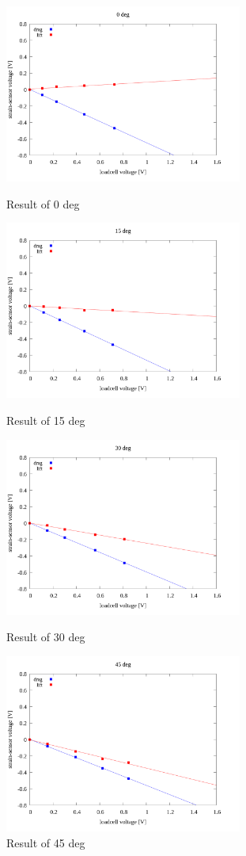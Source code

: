 \documentclass[twocolumn,a4j]{jsarticle}
\begin{document}
\begin{figure}[htbp]
    \footnotesize
    \begin{center}
        \includegraphics[width=78mm]{../images/linear/0_linear.png}
        \caption{Result of 0 deg}
        \includegraphics[width=78mm]{../images/linear/15_linear.png}
        \caption{Result of 15 deg}
        \includegraphics[width=78mm]{../images/linear/30_linear.png}
        \caption{Result of 30 deg}
        \includegraphics[width=78mm]{../images/linear/45_linear.png}
        \caption{Result of 45 deg}
    \end{center}
\end{figure}
\end{document}
